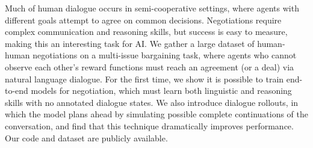 Much of human dialogue occurs in semi-cooperative settings, where agents with different goals attempt to agree on common decisions. Negotiations require complex communication and reasoning skills, but success is easy to measure, making this an interesting task for AI. We gather a large dataset of human-human negotiations on a multi-issue bargaining task, where agents who cannot observe each other's reward functions must reach an agreement (or a deal) via natural language dialogue. For the first time, we show it is possible to train end-to-end models for negotiation, which must learn both linguistic and reasoning skills with no annotated dialogue states. We also introduce dialogue rollouts, in which the model plans ahead by simulating possible complete continuations of the conversation, and find that this technique dramatically improves performance. Our code and dataset are publicly available.
